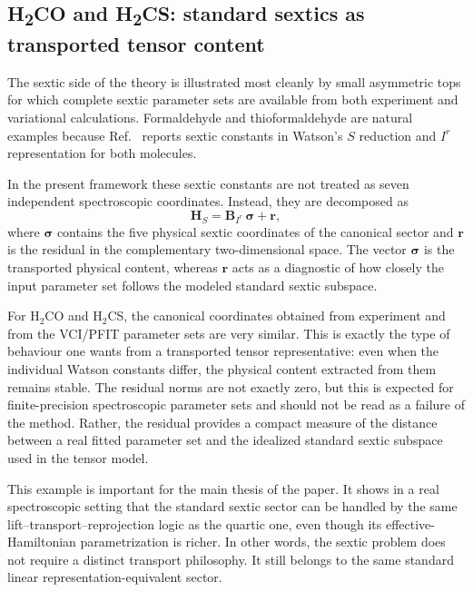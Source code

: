 \subsection{H\textsubscript{2}CO and H\textsubscript{2}CS: standard sextics as transported tensor content}

The sextic side of the theory is illustrated most cleanly by small asymmetric
tops for which complete sextic parameter sets are available from both
experiment and variational calculations. Formaldehyde and thioformaldehyde are
natural examples because Ref.~ reports sextic constants in
Watson's $S$ reduction and $I^r$ representation for both molecules.

In the present framework these sextic constants are not treated as seven
independent spectroscopic coordinates. Instead, they are decomposed as
\begin{equation}
\mathbf H_S = \mathbf B_{I^r}\,\boldsymbol\sigma + \mathbf r,
\end{equation}
where $\boldsymbol\sigma$ contains the five physical sextic coordinates of the
canonical sector and $\mathbf r$ is the residual in the complementary
two-dimensional space. The vector $\boldsymbol\sigma$ is the transported
physical content, whereas $\mathbf r$ acts as a diagnostic of how closely the
input parameter set follows the modeled standard sextic subspace.

For H$_2$CO and H$_2$CS, the canonical coordinates obtained from experiment and
from the VCI/PFIT parameter sets are very similar. This is exactly the type of
behaviour one wants from a transported tensor representative: even when the
individual Watson constants differ, the physical content extracted from them
remains stable. The residual norms are not exactly zero, but this is expected
for finite-precision spectroscopic parameter sets and should not be read as a
failure of the method. Rather, the residual provides a compact measure of the
distance between a real fitted parameter set and the idealized standard sextic
subspace used in the tensor model.

This example is important for the main thesis of the paper. It shows in a real
spectroscopic setting that the standard sextic sector can be handled by the
same lift--transport--reprojection logic as the quartic one, even though its
effective-Hamiltonian parametrization is richer. In other words, the sextic
problem does not require a distinct transport philosophy. It still belongs to
the same standard linear representation-equivalent sector.

